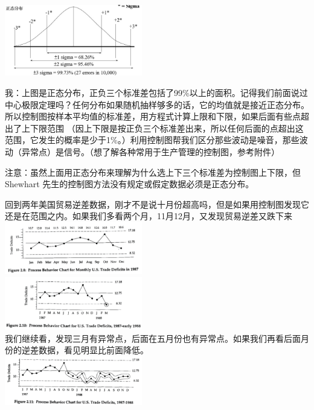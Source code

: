 \includegraphics[width=6cm]{NormalDistPicture1.jpg}

我：上图是正态分布，正负三个标准差包括了99\%以上的面积。记得我们前面说过中心极限定理吗？任何分布如果随机抽样够多的话，它的均值就是接近正态分布。所以控制图按样本平均值的标准差，用方程式计算上限和下限，如果后面有些点超出了上下限范围
（因上下限是按正负三个标准差出来，所以任何后面的点超出这范围，它发生的概率是少于1\%。）利用控制图帮我们区分那些波动是噪音，那些波动（异常点）是信号。（想了解各种常用于生产管理的控制图，参考附件）

注意：虽然上面用正态分布来理解为什么选上下三个标准差为控制图上下限，但Shewhart
先生的控制图方法没有规定或假定数据必须是正态分布。

回到两年美国贸易逆差数据，刚才不是说十月份超高吗，但是如果用控制图发现它还是在范围之内。如果我们多看两个月，11月12月，又发现贸易逆差又跌下来\\
\includegraphics[width=6cm]{The_key_fig281.png}\\
\includegraphics[width=6cm]{The_key_fig2101.png}\\
我们继续看，发现三月有异常点，后面在五月份也有异常点。如果我们再看后面月份的逆差数据，看见明显比前面降低。\\
\includegraphics[width=6cm]{The_key_fig2111.png}

